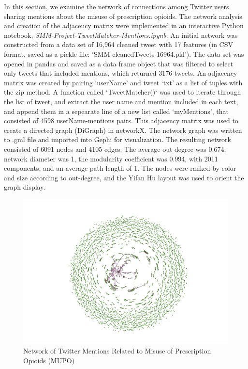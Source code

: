 \documentclass[sigconf]{acmart}
\begin{document}
In this section, we examine the network of connections among Twitter users 
sharing mentions about the misuse of prescription opioids. The network analysis 
and creation of the adjacency matrix were implemented in an interactive Python 
notebook, \emph{SMM-Project-TweetMatcher-Mentions.ipynb}. An initial network 
was constructed from a data set of 16,964 cleaned tweet with 17 features
(in CSV format, saved as a pickle file: `SMM-cleanedTweets-16964.pkl'). The 
data set was opened in pandas and saved as a data frame object that was 
filtered to select only tweets that included mentions, which returned 3176 
tweets. An adjacency matrix was created by pairing `userName' and tweet `txt' 
as a list of tuples with the zip method. A function called `TweetMatcher()` 
was used to iterate through the list of tweet, and extract the user name and 
mention included in each text, and append them in a sepearate line of a new 
list called ‘myMentions’, that consisted of 4598 userName-mentions pairs. 
This adjacency matrix was used to create a directed graph (DiGraph) in 
networkX. The network graph was written to .gml file and imported into 
Gephi for visualization. The resulting network consisted of 6091 nodes and 
4105 edges. The average out degree was 0.674, network diameter was 1, the 
modularity coefficient was 0.994, with 2011 components, and an average path 
length of 1. The nodes were ranked by color and size according to out-degree,
and the Yifan Hu layout was used to orient the graph display.

\begin{figure}[!ht]
  \centering\includegraphics[width=\columnwidth]{images/Figure1.pdf}
  \caption{Network of Twitter Mentions Related to Misuse of Prescription 
  Opioids (MUPO)}
  \label{f:Figure1}
\end{figure}
\end{document}
